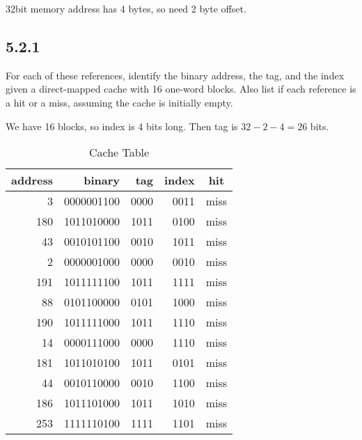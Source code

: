 \documentclass[paper=a4, fontsize=11pt]{scrartcl} %
\begin{document}
32bit memory address has 4 bytes, so need 2 byte offset.

\subsection{5.2.1}
\begin{fancyquotes}
    For each of these references, identify the binary address, the tag, and the index given a direct-mapped cache with 16 one-word blocks. Also list if each reference is a hit or a miss, assuming the cache is initially empty.
\end{fancyquotes}

We have 16 blocks, so index is 4 bits long. Then tag is $32-2-4=26$ bits.

\begin{table}[H]
    \caption{Cache Table}\label{tab:cache_table}
    \begin{center}
        \begin{tabular}{rrrrc}
        \toprule
        \textbf{address} & \textbf{binary} & \textbf{tag} & \textbf{index} & \textbf{hit} \\
        \midrule
          3 & 0000001100 & 0000 & 0011 & miss \\
        180 & 1011010000 & 1011 & 0100 & miss \\
         43 & 0010101100 & 0010 & 1011 & miss \\
          2 & 0000001000 & 0000 & 0010 & miss \\
        191 & 1011111100 & 1011 & 1111 & miss \\
         88 & 0101100000 & 0101 & 1000 & miss \\
        190 & 1011111000 & 1011 & 1110 & miss \\
         14 & 0000111000 & 0000 & 1110 & miss \\
        181 & 1011010100 & 1011 & 0101 & miss \\
         44 & 0010110000 & 0010 & 1100 & miss \\
        186 & 1011101000 & 1011 & 1010 & miss \\
        253 & 1111110100 & 1111 & 1101 & miss \\
        \bottomrule
        \end{tabular}
    \end{center}
\end{table}
\end{document}
